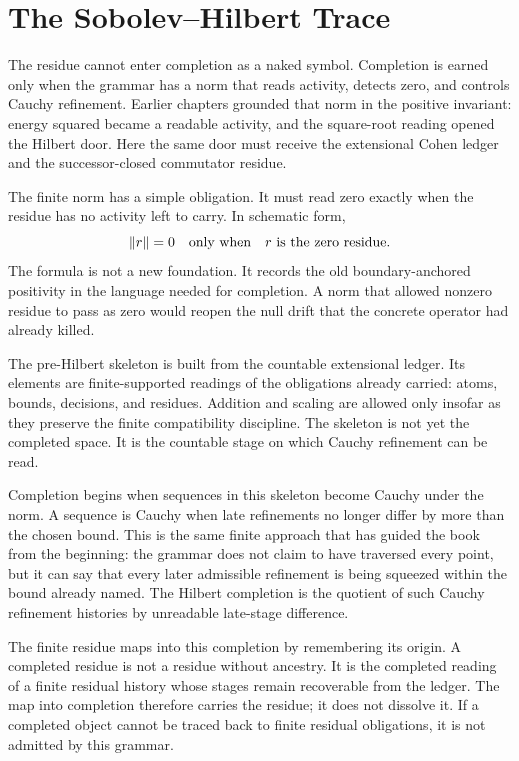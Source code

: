 \section{The Sobolev--Hilbert Trace}

The residue cannot enter completion as a naked symbol. Completion is earned
only when the grammar has a norm that reads activity, detects zero, and
controls Cauchy refinement. Earlier chapters grounded that norm in the
positive invariant: energy squared became a readable activity, and the
square-root reading opened the Hilbert door. Here the same door must receive
the extensional Cohen ledger and the successor-closed commutator residue.

The finite norm has a simple obligation. It must read zero exactly when the
residue has no activity left to carry. In schematic form,
\[
  \|r\| = 0 \quad\hbox{only when}\quad r \hbox{ is the zero residue.}
\]
The formula is not a new foundation. It records the old boundary-anchored
positivity in the language needed for completion. A norm that allowed
nonzero residue to pass as zero would reopen the null drift that the
concrete operator had already killed.

The pre-Hilbert skeleton is built from the countable extensional ledger.
Its elements are finite-supported readings of the obligations already
carried: atoms, bounds, decisions, and residues. Addition and scaling are
allowed only insofar as they preserve the finite compatibility discipline.
The skeleton is not yet the completed space. It is the countable stage on
which Cauchy refinement can be read.

Completion begins when sequences in this skeleton become Cauchy under the
norm. A sequence is Cauchy when late refinements no longer differ by more
than the chosen bound. This is the same finite approach that has guided the
book from the beginning: the grammar does not claim to have traversed every
point, but it can say that every later admissible refinement is being squeezed
within the bound already named. The Hilbert completion is the quotient of
such Cauchy refinement histories by unreadable late-stage difference.

The finite residue maps into this completion by remembering its origin. A
completed residue is not a residue without ancestry. It is the completed
reading of a finite residual history whose stages remain recoverable from
the ledger. The map into completion therefore carries the residue; it does
not dissolve it. If a completed object cannot be traced back to finite
residual obligations, it is not admitted by this grammar.

